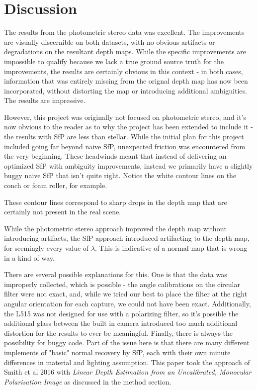 \documentclass[final]{cvpr}
\begin{document}
\section{Discussion}
The results from the photometric stereo data was excellent. The improvements are visually discernible on both datasets, with no obvious artifacts or degradations on the resultant depth maps. While the specific improvements are impossible to qualify because we lack a true ground source truth for the improvements, the results are certainly obvious in this context - in both cases, information that was entirely missing from the orignal depth map has now been incorporated, without distorting the map or introducing additional ambiguities. The results are impressive. 

However, this project was originally not focused on photometric stereo, and it's now obvious to the reader as to why the project has been extended to include it - the results with SfP are less than stellar. While the initial plan for this project included going far beyond naive SfP, unexpected friction was encountered from the very beginning. These headwinds meant that instead of delivering an optimized SfP with ambiguity improvements, instead we primarily have a slightly buggy naive SfP that isn't quite right. Notice the white contour lines on the conch or foam roller, for example. 

These contour lines correspond to sharp drops in the depth map that are certainly not present in the real scene. 

While the photometric stereo approach improved the depth map without introducing artifacts, the SfP approach introduced  artifacting to the depth map, for seemingly every value of $\lambda$. This is indicative of a normal map that is wrong in a kind of way. 

There are several possible explanations for this. One is that the data was improperly collected, which is possible - the angle calibrations on the circular filter were not exact, and, while we tried our best to place the filter at the right angular orientation for each capture, we could not have been exact. Additionally, the L515 was not designed for use with a polarizing filter, so it's possible the additional glass between the built in camera introduced too much additional distortion for the results to ever be meaningful. Finally, there is always the possibility for buggy code. Part of the issue here is that there are many different implements of "basic" normal recovery by SfP, each with their own minute differences in material and lighting assumption. This paper took the approach of Smith et al 2016 with \textit{Linear Depth Estimation from an Uncalibrated,  Monocular Polarisation Image} \cite{SmithSfPMath} as discussed in the method section. 
\end{document}
